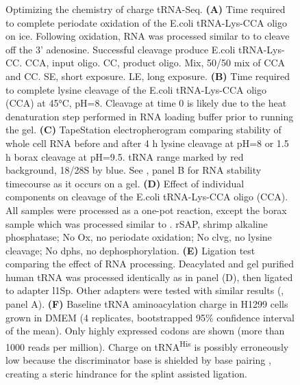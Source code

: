 \documentclass[9pt,lineno]{elife}
\begin{document}
\begin{figure}[ht!]
\ContinuedFloat
\caption{
Optimizing the chemistry of charge tRNA-Seq.
\textbf{(A)} Time required to complete periodate oxidation of the E.coli tRNA-Lys-CCA oligo on ice.
Following oxidation, RNA was processed similar to \cite{Evans2017-st} to cleave off the 3’ adenosine.
Successful cleavage produce E.coli tRNA-Lys-CC.
CCA, input oligo.
CC, product oligo.
Mix, 50/50 mix of CCA and CC.
SE, short exposure.
LE, long exposure.
\textbf{(B)} Time required to complete lysine cleavage of the E.coli tRNA-Lys-CCA oligo (CCA) at 45°C, pH=8.
Cleavage at time 0 is likely due to the heat denaturation step performed in RNA loading buffer prior to running the gel.
\textbf{(C)} TapeStation electropherogram comparing stability of whole cell RNA before and after 4 h lysine cleavage at pH=8 or 1.5 h borax cleavage at pH=9.5.
tRNA range marked by red background, 18/28S by blue.
See , panel B for RNA stability timecourse as it occurs on a gel.
\textbf{(D)} Effect of individual components on cleavage of the E.coli tRNA-Lys-CCA oligo (CCA).
All samples were processed as a one-pot reaction, except the borax sample which was processed similar to \cite{Evans2017-st}.
rSAP, shrimp alkaline phosphatase; No Ox, no periodate oxidation; No clvg, no lysine cleavage; No dphs, no dephosphorylation.
\textbf{(E)} Ligation test comparing the effect of RNA processing.
Deacylated and gel purified human tRNA was processed identically as in panel (D), then ligated to adapter l1Sp.
Other adapters were tested with similar results (, panel A).
\textbf{(F)} Baseline tRNA aminoacylation charge in H1299 cells grown in DMEM (4 replicates, bootstrapped 95\% confidence interval of the mean).
Only highly expressed codons are shown (more than 1000 reads per million).
Charge on tRNA\textsuperscript{His} is possibly erroneously low because the discriminator base is shielded by base pairing \citep{Heinemann2012-hq}, creating a steric hindrance for the splint assisted ligation.
}
\label{fig:Fig2}


\end{figure}
\end{document}
